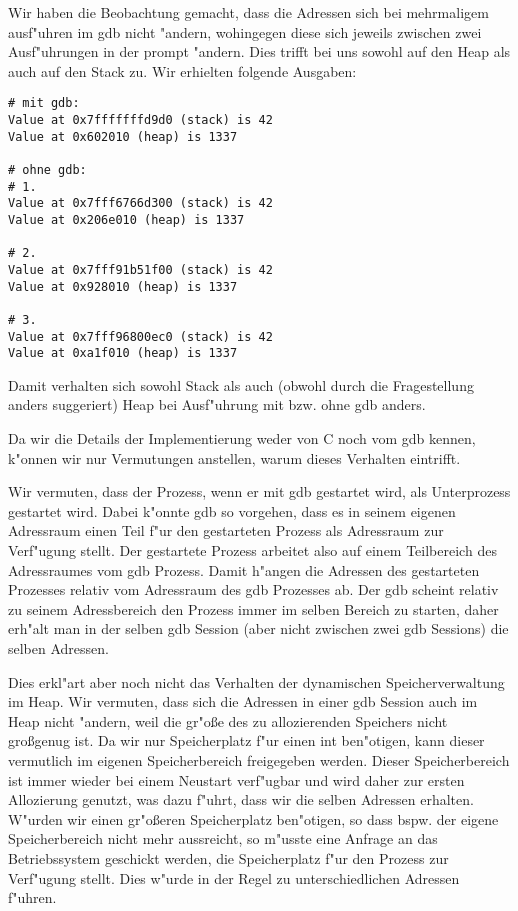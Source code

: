 \documentclass[a4paper,11pt]{article}             %
\begin{document}

Wir haben die Beobachtung gemacht, dass die Adressen sich bei mehrmaligem ausf"uhren im gdb
nicht "andern, wohingegen diese sich jeweils zwischen zwei Ausf"uhrungen in der
prompt "andern. Dies trifft bei uns sowohl auf den Heap als auch auf den Stack
zu. 
Wir erhielten folgende Ausgaben:
\begin{lstlisting}
# mit gdb:
Value at 0x7fffffffd9d0 (stack) is 42
Value at 0x602010 (heap) is 1337

# ohne gdb:
# 1.
Value at 0x7fff6766d300 (stack) is 42
Value at 0x206e010 (heap) is 1337

# 2.
Value at 0x7fff91b51f00 (stack) is 42
Value at 0x928010 (heap) is 1337

# 3.
Value at 0x7fff96800ec0 (stack) is 42
Value at 0xa1f010 (heap) is 1337
\end{lstlisting}

Damit verhalten sich sowohl Stack als auch (obwohl durch die Fragestellung
anders suggeriert) Heap bei Ausf"uhrung mit bzw. ohne gdb anders.

Da wir die Details der Implementierung weder von C noch vom gdb kennen, k"onnen
wir nur Vermutungen anstellen, warum dieses Verhalten eintrifft.

Wir vermuten, dass der Prozess, wenn er mit gdb gestartet wird, als Unterprozess
gestartet wird. Dabei k"onnte gdb so vorgehen, dass es in seinem eigenen
Adressraum einen Teil f"ur den gestarteten Prozess als Adressraum zur Verf"ugung stellt. Der
gestartete Prozess arbeitet also auf einem Teilbereich des Adressraumes vom gdb
Prozess. Damit h"angen die Adressen des gestarteten Prozesses relativ vom
Adressraum des gdb Prozesses ab. Der gdb scheint relativ zu seinem Adressbereich
den Prozess immer im selben Bereich zu starten, daher erh"alt man in der selben
gdb Session (aber nicht zwischen zwei gdb Sessions) die selben Adressen. 

Dies erkl"art aber noch nicht das Verhalten der dynamischen Speicherverwaltung
im Heap. 
Wir vermuten, dass sich die Adressen in einer gdb Session auch im Heap nicht
"andern, weil die gr"o\ss e des zu allozierenden Speichers nicht gro\ss genug
ist. Da wir nur Speicherplatz f"ur einen int ben"otigen, kann dieser vermutlich
im eigenen Speicherbereich freigegeben werden. Dieser Speicherbereich ist immer
wieder bei einem Neustart verf"ugbar und wird daher zur ersten Allozierung
genutzt, was dazu f"uhrt, dass wir die selben Adressen erhalten. 
W"urden wir einen gr"o\ss eren Speicherplatz ben"otigen, so dass bspw. der
eigene Speicherbereich nicht mehr aussreicht, so m"usste eine Anfrage an das
Betriebssystem geschickt werden, die Speicherplatz f"ur den Prozess zur
Verf"ugung stellt. Dies w"urde in der Regel zu unterschiedlichen Adressen
f"uhren. 
\end{document}
